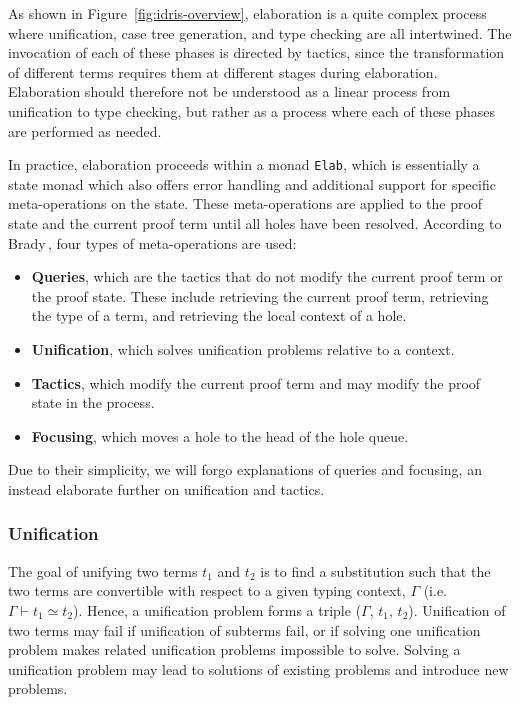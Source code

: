 As shown in Figure~\ref{fig:idris-overview}, elaboration is a quite complex
process where unification, case tree generation, and type checking are all
intertwined. The invocation of each of these phases is directed by tactics,
since the transformation of different terms requires them at different stages
during elaboration. Elaboration should therefore not be understood as a linear
process from unification to type checking, but rather as a process where each of
these phases are performed as needed.

In practice, elaboration proceeds within a monad \texttt{Elab}, which is
essentially a state monad which also offers error handling and additional
support for specific meta-operations on the state. These meta-operations are
applied to the proof state and the current proof term until all holes have been
resolved. According to Brady\,\citep{BradyIdrisImpl13}, four types of meta-operations are used:
\begin{itemize}
\item \textbf{Queries}, which are the tactics that do not modify the current
  proof term or the proof state. These include retrieving the current proof
  term, retrieving the type of a term, and retrieving the local context of a hole.
\item \textbf{Unification}, which solves unification problems relative to a context.
\item \textbf{Tactics}, which modify the current proof term and may modify the
  proof state in the process.
\item \textbf{Focusing}, which moves a hole to the head of the hole queue.
\end{itemize}
Due to their simplicity, we will forgo explanations of queries and
focusing, an instead elaborate further on unification and tactics.

\subsubsection{Unification}
The goal of unifying two terms $t_{1}$ and $t_{2}$ is to find a substitution
such that the two terms are convertible with respect to a given typing context,
$\Gamma$ (i.e. $\Gamma\vdash t_{1} \simeq t_{2}$). Hence, a unification problem
forms a triple ($\Gamma$, $t_{1}$, $t_{2}$). Unification of two terms may fail
if unification of subterms fail, or if solving one unification problem makes
related unification problems impossible to solve. Solving a unification problem
may lead to solutions of existing problems and introduce new problems.

